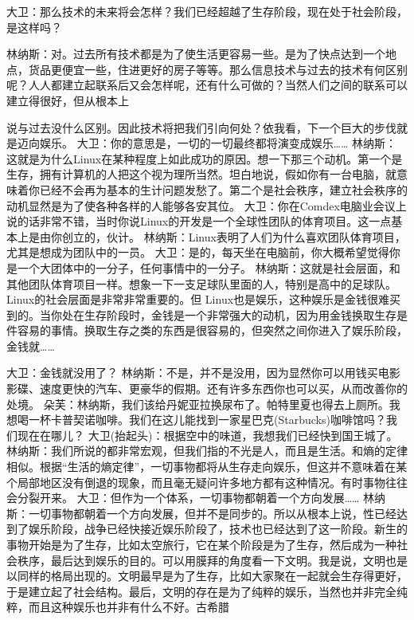 \documentclass[12pt,UTF8]{ctexbook}
\begin{document}
大卫：那么技术的未来将会怎样？我们已经超越了生存阶段，现在处于社会阶段，是这样吗？

林纳斯：对。过去所有技术都是为了使生活更容易一些。是为了快点达到一个地点，货品更便宜一些，住进更好的房子等等。那么信息技术与过去的技术有何区别呢？人人都建立起联系后又会怎样呢，还有什么可做的？当然人们之间的联系可以建立得很好，但从根本上

说与过去没什么区别。因此技术将把我们引向何处？依我看，下一个巨大的步伐就是迈向娱乐。
大卫：你的意思是，一切的一切最终都将演变成娱乐……
林纳斯：这就是为什么Linux在某种程度上如此成功的原因。想一下那三个动机。第一个是生存，拥有计算机的人把这个视为理所当然。坦白地说，假如你有一台电脑，就意味着你已经不会再为基本的生计问题发愁了。第二个是社会秩序，建立社会秩序的动机显然是为了使各种各样的人能够各安其位。
大卫：你在Comdex电脑业会议上说的话非常不错，当时你说Linux的开发是一个全球性团队的体育项目。这一点基本上是由你创立的，伙计。
林纳斯：Linux表明了人们为什么喜欢团队体育项目，尤其是想成为团队中的一员。
大卫：是的，每天坐在电脑前，你大概希望觉得你是一个大团体中的一分子，任何事情中的一分子。
林纳斯：这就是社会层面，和其他团队体育项目一样。想象一下一支足球队里面的人，特别是高中的足球队。Linux的社会层面是非常非常重要的。但 Linux也是娱乐，这种娱乐是金钱很难买到的。当你处在生存阶段时，金钱是一个非常强大的动机，因为用金钱换取生存是件容易的事情。换取生存之类的东西是很容易的，但突然之间你进入了娱乐阶段，金钱就……

大卫：金钱就没用了？
林纳斯：不是，并不是没用，因为显然你可以用钱买电影影碟、速度更快的汽车、更豪华的假期。还有许多东西你也可以买，从而改善你的处境。
朵芙：林纳斯，我们该给丹妮亚拉换尿布了。帕特里夏也得去上厕所。我想喝一杯卡普契诺咖啡。我们在这儿能找到一家星巴克(Starbucks)咖啡馆吗？我们现在在哪儿？
大卫(抬起头)：根据空中的味道，我想我们已经快到国王城了。
林纳斯：我们所说的都非常宏观，但我们指的不光是人，而且是生活。和熵的定律相似。根据“生活的熵定律”，一切事物都将从生存走向娱乐，但这并不意味着在某个局部地区没有倒退的现象，而且毫无疑问许多地方都有这种情况。有时事物往往会分裂开来。
大卫：但作为一个体系，一切事物都朝着一个方向发展……
林纳斯：一切事物都朝着一个方向发展，但并不是同步的。所以从根本上说，性已经达到了娱乐阶段，战争已经快接近娱乐阶段了，技术也已经达到了这一阶段。新生的事物开始是为了生存，比如太空旅行，它在某个阶段是为了生存，然后成为一种社会秩序，最后达到娱乐的目的。可以用膜拜的角度看一下文明。我是说，文明也是以同样的格局出现的。文明最早是为了生存，比如大家聚在一起就会生存得更好，于是建立起了社会结构。最后，文明的存在是为了纯粹的娱乐，当然也并非完全纯粹，而且这种娱乐也并非有什么不好。古希腊
\end{document}
